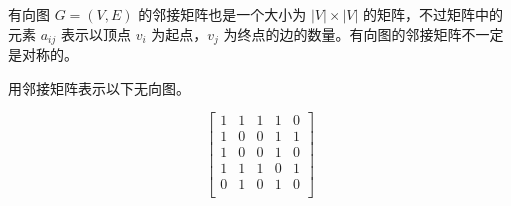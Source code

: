 有向图 $G=(V, E)$ 的邻接矩阵也是一个大小为 $|V| \times |V|$ 的矩阵，不过矩阵中的元素 $a_{ij}$ 表示以顶点 $v_i$ 为起点，$v_j$ 为终点的边的数量。有向图的邻接矩阵不一定是对称的。
\begin{collections}
    \begin{example}
        用邻接矩阵表示以下无向图。
        \vspace{-2em}
        \begin{center}
        \end{center}
    \end{example}
    \begin{solution}
        $$
        \begin{bmatrix}
            1 & 1 & 1 & 1 & 0 \\
            1 & 0 & 0 & 1 & 1 \\
            1 & 0 & 0 & 1 & 0 \\
            1 & 1 & 1 & 0 & 1 \\
            0 & 1 & 0 & 1 & 0 \\
        \end{bmatrix}
        $$
    \end{solution}

    \spare


\end{collections}
